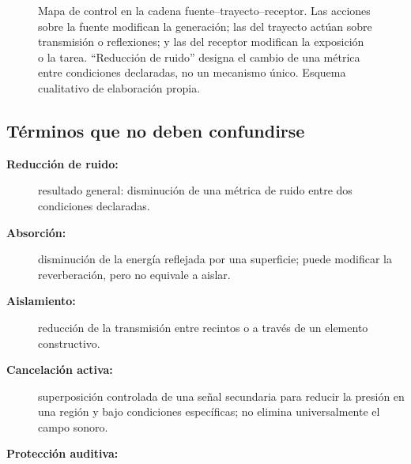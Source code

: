 \begin{figure}[htbp]
    \centering
    
    \caption{Mapa de control en la cadena fuente--trayecto--receptor. Las
    acciones sobre la fuente modifican la generación; las del trayecto actúan
    sobre transmisión o reflexiones; y las del receptor modifican la
    exposición o la tarea. ``Reducción de ruido'' designa el cambio de una
    métrica entre condiciones declaradas, no un mecanismo único. Esquema
    cualitativo de elaboración propia.}
    \label{fig:u10-control-ftr}
\end{figure}

\subsection{Términos que no deben confundirse}

\begin{description}
    \item[\textbf{Reducción de ruido:}] resultado general: disminución de una
    métrica de ruido entre dos condiciones declaradas.
    \item[\textbf{Absorción:}] disminución de la energía reflejada por una
    superficie; puede modificar la reverberación, pero no equivale a aislar.
    \item[\textbf{Aislamiento:}] reducción de la transmisión entre recintos o
    a través de un elemento constructivo.
    \item[\textbf{Cancelación activa:}] superposición controlada de una señal
    secundaria para reducir la presión en una región y bajo condiciones
    específicas; no elimina universalmente el campo sonoro.
    \item[\textbf{Protección auditiva:}] 
\end{description}

